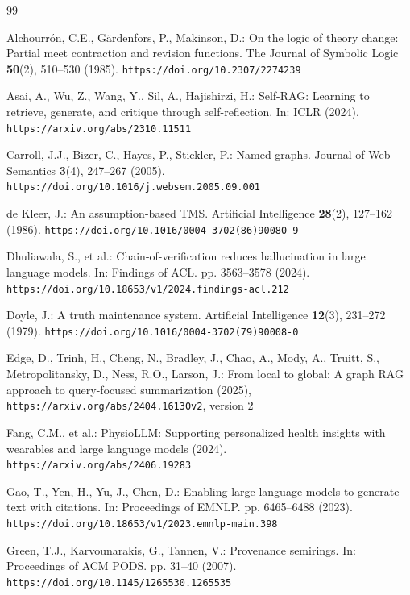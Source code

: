 \documentclass[runningheads]{llncs}
\begin{document}
\clearpage
\label{page:references}
\begin{thebibliography}{99}
\providecommand{\url}[1]{\texttt{#1}}
\providecommand{\urlprefix}{URL }
\renewcommand{\doi}[1]{\url{https://doi.org/#1}}

Alchourr\'{o}n, C.E., G\"ardenfors, P., Makinson, D.: On the logic of theory
change: Partial meet contraction and revision functions. The Journal of
Symbolic Logic \textbf{50}(2), 510--530 (1985). \url{https://doi.org/10.2307/2274239}

Asai, A., Wu, Z., Wang, Y., Sil, A., Hajishirzi, H.: Self-RAG: Learning to
retrieve, generate, and critique through self-reflection. In: ICLR (2024).
\url{https://arxiv.org/abs/2310.11511}

Carroll, J.J., Bizer, C., Hayes, P., Stickler, P.: Named graphs.
Journal of Web Semantics \textbf{3}(4), 247--267 (2005).
\url{https://doi.org/10.1016/j.websem.2005.09.001}

de Kleer, J.: An assumption-based TMS. Artificial Intelligence \textbf{28}(2),
127--162 (1986). \url{https://doi.org/10.1016/0004-3702(86)90080-9}

Dhuliawala, S., et al.: Chain-of-verification reduces hallucination in large
language models. In: Findings of ACL. pp. 3563--3578 (2024).
\url{https://doi.org/10.18653/v1/2024.findings-acl.212}

Doyle, J.: A truth maintenance system. Artificial Intelligence  \textbf{12}(3),
   231--272 (1979). \doi{10.1016/0004-3702(79)90008-0}

Edge, D., Trinh, H., Cheng, N., Bradley, J., Chao, A., Mody, A., Truitt, S.,
  Metropolitansky, D., Ness, R.O., Larson, J.: From local to global: A graph
  {RAG} approach to query-focused summarization (2025),
  \url{https://arxiv.org/abs/2404.16130v2}, version 2

Fang, C.M., et al.: PhysioLLM: Supporting personalized health insights with
wearables and large language models (2024).
\url{https://arxiv.org/abs/2406.19283}

Gao, T., Yen, H., Yu, J., Chen, D.: Enabling large language models to generate
text with citations. In: Proceedings of EMNLP. pp. 6465--6488 (2023).
\url{https://doi.org/10.18653/v1/2023.emnlp-main.398}

Green, T.J., Karvounarakis, G., Tannen, V.: Provenance semirings. In:
  Proceedings of ACM PODS. pp. 31--40 (2007). \doi{10.1145/1265530.1265535}


\end{thebibliography}
\end{document}
